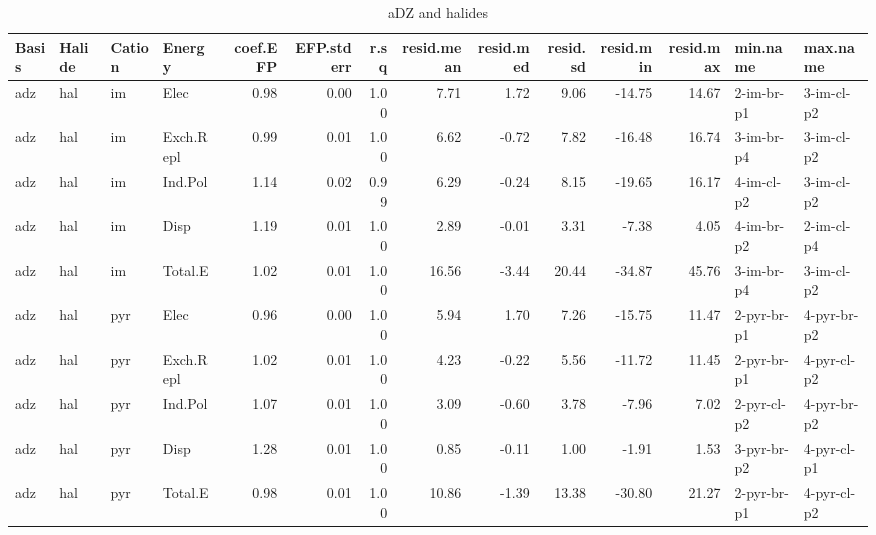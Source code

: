 \documentclass[a4paper]{article}
\begin{document}
\begin{landscape}
\begin{table}[ht]
\centering
\begin{tabular}{llllrrrrrrrrll}
  \hline
Basis & Halide & Cation & Energy & coef.EFP & EFP.stderr & r.sq & resid.mean & resid.med & resid.sd & resid.min & resid.max & min.name & max.name \\ 
  \hline
adz & hal & im & Elec & 0.98 & 0.00 & 1.00 & 7.71 & 1.72 & 9.06 & -14.75 & 14.67 & 2-im-br-p1 & 3-im-cl-p2 \\ 
  adz & hal & im & Exch.Repl & 0.99 & 0.01 & 1.00 & 6.62 & -0.72 & 7.82 & -16.48 & 16.74 & 3-im-br-p4 & 3-im-cl-p2 \\ 
  adz & hal & im & Ind.Pol & 1.14 & 0.02 & 0.99 & 6.29 & -0.24 & 8.15 & -19.65 & 16.17 & 4-im-cl-p2 & 3-im-cl-p2 \\ 
  adz & hal & im & Disp & 1.19 & 0.01 & 1.00 & 2.89 & -0.01 & 3.31 & -7.38 & 4.05 & 4-im-br-p2 & 2-im-cl-p4 \\ 
  adz & hal & im & Total.E & 1.02 & 0.01 & 1.00 & 16.56 & -3.44 & 20.44 & -34.87 & 45.76 & 3-im-br-p4 & 3-im-cl-p2 \\ 
  adz & hal & pyr & Elec & 0.96 & 0.00 & 1.00 & 5.94 & 1.70 & 7.26 & -15.75 & 11.47 & 2-pyr-br-p1 & 4-pyr-br-p2 \\ 
  adz & hal & pyr & Exch.Repl & 1.02 & 0.01 & 1.00 & 4.23 & -0.22 & 5.56 & -11.72 & 11.45 & 2-pyr-br-p1 & 4-pyr-cl-p2 \\ 
  adz & hal & pyr & Ind.Pol & 1.07 & 0.01 & 1.00 & 3.09 & -0.60 & 3.78 & -7.96 & 7.02 & 2-pyr-cl-p2 & 4-pyr-br-p2 \\ 
  adz & hal & pyr & Disp & 1.28 & 0.01 & 1.00 & 0.85 & -0.11 & 1.00 & -1.91 & 1.53 & 3-pyr-br-p2 & 4-pyr-cl-p1 \\ 
  adz & hal & pyr & Total.E & 0.98 & 0.01 & 1.00 & 10.86 & -1.39 & 13.38 & -30.80 & 21.27 & 2-pyr-br-p1 & 4-pyr-cl-p2 \\ 
   \hline
\end{tabular}
\caption{aDZ and halides}
\end{table}



\end{landscape}
\end{document}
